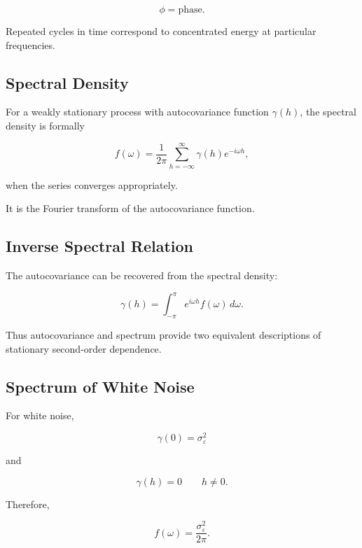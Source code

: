 \[
\phi
=
\text{phase}.
\]

Repeated cycles in time correspond to concentrated energy at particular
frequencies.

\subsection{Spectral Density}
\label{subsec:spectral-density}

For a weakly stationary process with autocovariance function
\(\gamma(h)\), the spectral density is formally

\[
\boxed{
f(\omega)
=
\frac1{2\pi}
\sum_{h=-\infty}^{\infty}
\gamma(h)
e^{-i\omega h},
}
\]

when the series converges appropriately.

It is the Fourier transform of the autocovariance function.

\subsection{Inverse Spectral Relation}
\label{subsec:inverse-spectral-relation}

The autocovariance can be recovered from the spectral density:

\[
\boxed{
\gamma(h)
=
\int_{-\pi}^{\pi}
e^{i\omega h}
f(\omega)
\,d\omega.
}
\]

Thus autocovariance and spectrum provide two equivalent descriptions of
stationary second-order dependence.

\subsection{Spectrum of White Noise}
\label{subsec:white-noise-spectrum}

For white noise,

\[
\gamma(0)
=
\sigma_\varepsilon^2
\]

and

\[
\gamma(h)=0
\qquad
h\neq0.
\]

Therefore,

\[
\boxed{
f(\omega)
=
\frac{
\sigma_\varepsilon^2
}{
2\pi
}.
}
\]

